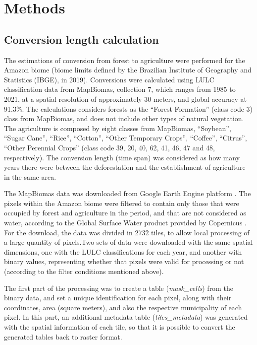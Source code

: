 \documentclass[essd, manuscript]{copernicus}
\begin{document}
\section{Methods}

\subsection{Conversion length calculation}

The estimations of conversion from forest to agriculture were performed for the Amazon biome (biome limits defined by the Brazilian Institute of Geography and Statistics (IBGE), in 2019).
Conversions were calculated using LULC classification data from MapBiomas, collection 7, which ranges from 1985 to 2021, at a spatial resolution of approximately 30 meters, and global accuracy at 91.3\%.
The calculations considers forests as the ``Forest Formation'' (class code 3) class from MapBiomas, and does not include other types of natural vegetation.
The agriculture is composed by eight classes from MapBiomas, ``Soybean'', ``Sugar Cane'', ``Rice'', ``Cotton'', ``Other Temporary Crops'', ``Coffee'', ``Citrus'', ``Other Perennial Crops'' (class code 39, 20, 40, 62, 41, 46, 47 and 48, respectively).
The conversion length (time span) was considered as how many years there were between the deforestation and the establishment of agriculture in the same area.

The MapBiomas data was downloaded from Google Earth Engine platform \citep{Gorelick2017}.
The pixels within the Amazon biome were filtered to contain only those that were occupied by forest and agriculture in the period, and that are not considered as water, according to the Global Surface Water product provided by Copernicus \citep{Pekel2016}.
For the download, the data was divided in 2732 tiles, to allow local processing of a large quantity of pixels.Two sets of data were downloaded with the same spatial dimensions, one with the LULC classifications for each year, and another with binary values, representing whether that pixels were valid for processing or not (according to the filter conditions mentioned above).

The first part of the processing was to create a table (\emph{mask\_cells}) from the binary data, and set a unique identification for each pixel, along with their coordinates, area (square meters), and also the respective municipality of each pixel.
In this part, an additional metadata table (\emph{tiles\_metadata}) was generated with the spatial information of each tile, so that it is possible to convert the generated tables back to raster format.
\end{document}
